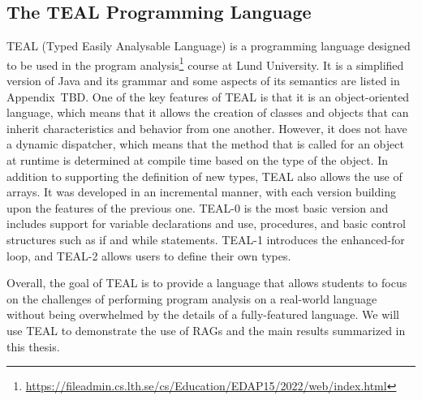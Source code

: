 \subsection{The TEAL Programming Language}
TEAL (Typed Easily Analysable Language) is a programming language designed to be used in the 
program analysis\footnote{\url{https://fileadmin.cs.lth.se/cs/Education/EDAP15/2022/web/index.html}} course at Lund University.
It is a simplified version of Java and its grammar and some aspects of its semantics are 
listed in Appendix~TBD.  %
One of the key features of TEAL is that it is an object-oriented language, 
which means that it allows the creation of classes and objects that can inherit 
characteristics and behavior from one another. However, it does not have a dynamic 
dispatcher, which means that the method that is called for an object at runtime 
is determined at compile time based on the type of the object.
In addition to supporting the definition of new types, TEAL also allows the use 
of arrays. It was developed in an incremental manner, with each version building 
upon the features of the previous one. TEAL-0 is the most basic version and includes 
support for variable declarations and use, procedures, and basic control structures such as if 
and while statements. TEAL-1 introduces the enhanced-for loop, and TEAL-2 allows users to 
define their own types.

Overall, the goal of TEAL is to provide a language that allows students to 
focus on the challenges of performing program analysis on a real-world language 
without being overwhelmed by the details of a fully-featured language.
We will use TEAL to demonstrate the use of RAGs and the main results summarized in this thesis.

